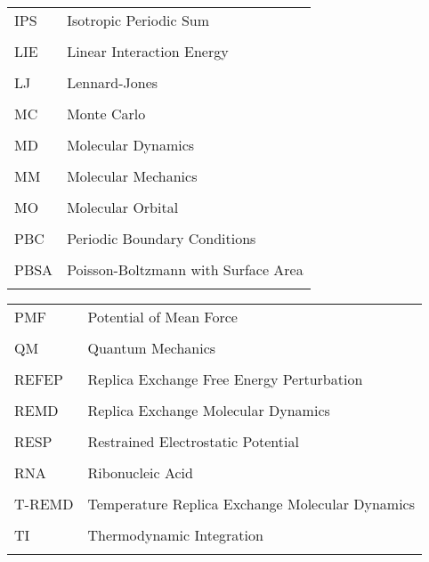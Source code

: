 \begin{tabular}{lp{5in}}
IPS & Isotropic Periodic Sum \\ \\

LIE & Linear Interaction Energy \\ \\

LJ & Lennard-Jones \\ \\

MC & Monte Carlo \\ \\

MD & Molecular Dynamics \\ \\

MM & Molecular Mechanics \\ \\

MO & Molecular Orbital \\ \\

PBC & Periodic Boundary Conditions \\ \\

PBSA & Poisson-Boltzmann with Surface Area \\ \\

\end{tabular}
\newpage
\begin{tabular}{lp{5in}}

PMF & Potential of Mean Force \\ \\

QM & Quantum Mechanics \\ \\

REFEP & Replica Exchange Free Energy Perturbation \\ \\

REMD & Replica Exchange Molecular Dynamics \\ \\

RESP & Restrained Electrostatic Potential \\ \\

RNA & Ribonucleic Acid \\ \\

T-REMD & Temperature Replica Exchange Molecular Dynamics \\ \\

TI & Thermodynamic Integration \\ \\

\end{tabular}

